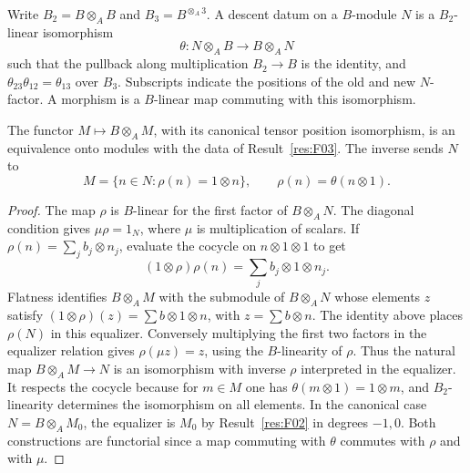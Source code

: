 \begin{definition}\label{res:F03}
Write \(B_2=B\otimes_A B\) and \(B_3=B^{\otimes_A3}\). A descent
datum on a \(B\)-module \(N\) is a \(B_2\)-linear isomorphism
\[
 \theta:N\otimes_A B\longrightarrow B\otimes_A N
\]
such that the pullback along multiplication \(B_2\to B\) is the
identity, and \(\theta_{23}\theta_{12}=\theta_{13}\) over \(B_3\).
Subscripts indicate the positions of the old and new \(N\)-factor.
A morphism is a \(B\)-linear map commuting with this isomorphism.
\end{definition}

\begin{theorem}\label{res:F04}
The functor \(M\mapsto B\otimes_A M\), with its canonical tensor
position isomorphism, is an equivalence onto modules with the
data of Result~\ref{res:F03}. The inverse sends \(N\) to
\[
 M=\{n\in N:\rho(n)=1\otimes n\},\qquad
 \rho(n)=\theta(n\otimes1).
\]
\end{theorem}
\begin{proof}
The map \(\rho\) is \(B\)-linear for the first factor of \(B\otimes_A N\).
The diagonal condition gives \(\mu\rho=1_N\), where \(\mu\) is
multiplication of scalars. If \(\rho(n)=\sum_j b_j\otimes n_j\),
evaluate the cocycle on \(n\otimes1\otimes1\) to get
\[
 (1\otimes\rho)\rho(n)=\sum_j b_j\otimes1\otimes n_j .
\]
Flatness identifies \(B\otimes_A M\) with the submodule of
\(B\otimes_A N\) whose elements \(z\) satisfy
\((1\otimes\rho)(z)=\sum b\otimes1\otimes n\), with
\(z=\sum b\otimes n\). The identity above places \(\rho(N)\)
in this equalizer. Conversely multiplying the first two factors in
the equalizer relation gives \(\rho(\mu z)=z\), using the \(B\)-linearity
of \(\rho\). Thus the natural map \(B\otimes_A M\to N\) is an isomorphism
with inverse \(\rho\) interpreted in the equalizer.
It respects the cocycle because for \(m\in M\) one has
\(\theta(m\otimes1)=1\otimes m\), and \(B_2\)-linearity determines
the isomorphism on all elements. In the canonical case
\(N=B\otimes_A M_0\), the equalizer is \(M_0\) by
Result~\ref{res:F02} in degrees \(-1,0\).
Both constructions are functorial since a map commuting with
\(\theta\) commutes with \(\rho\) and with \(\mu\).
\end{proof}


